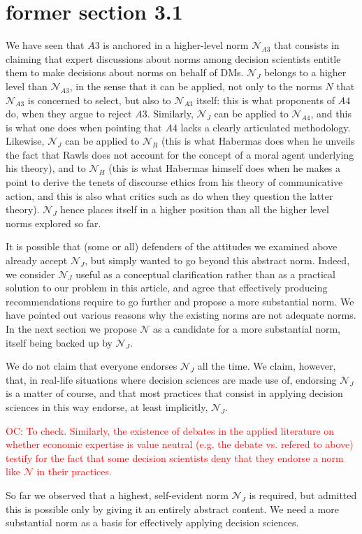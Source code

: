 \documentclass[preprint, french, english, 11pt, authoryear]{elsarticle}%
\newcommand{\commentOC}[1]{\textcolor{red}{OC: #1}}
\newcommand{\adv}{\mathscr{N}}
\newcommand{\fadv}{\mathscr{N}_J}%
\begin{document}
\section{former section 3.1}
We have seen that $A3$ is anchored in a higher-level norm $\mathscr{N}_{A3}$ that consists in claiming that expert discussions about norms among decision scientists entitle them to make decisions about norms on behalf of \acp{DM}. $\fadv$ belongs to a higher level than $\mathscr{N}_{A3}$, in the sense that it can be applied, not only to the norms $N$ that $\mathscr{N}_{A3}$ is concerned to select, but also to $\mathscr{N}_{A3}$ itself: this is what proponents of $A4$ do, when they argue to reject $A3$. Similarly, $\fadv$ can be applied to $\mathscr{N}_{A4}$, and this is what one does when pointing that $A4$ lacks a clearly articulated methodology. Likewise, $\fadv$ can be applied to $\mathscr{N}_{R}$ (this is what Habermas does when he unveils the fact that Rawls does not account for the concept of a moral agent underlying his theory), and to $\mathscr{N}_{H}$ (this is what Habermas himself does when he makes a point to derive the tenets of discourse ethics from his theory of communicative action, and this is also what critics such as \citet{honneth_kritik_1985} do when they question the latter theory). $\fadv$ hence places itself in a higher position than all the higher level norms explored so far.

It is possible that (some or all) defenders of the attitudes we examined above already accept $\fadv$, but simply wanted to go beyond this abstract norm. Indeed, we consider $\fadv$ useful as a conceptual clarification rather than as a practical solution to our problem in this article, and agree that effectively producing recommendations require to go further and propose a more substantial norm. We have pointed out various reasons why the existing norms are not adequate norms. In the next section we propose $\adv$ as a candidate for a more substantial norm, itself being backed up by $\fadv$. 

We do not claim that everyone endorses $\fadv$ all the time. We claim, however, that, in real-life situations where decision sciences are made use of, endorsing $\fadv$ is a matter of course, and that most practices that consist in applying decision sciences in this way endorse, at least implicitly, $\fadv$.


\commentOC{To check. Similarly, the existence of debates in the applied literature on whether economic expertise is value neutral (e.g. the debate \citet{spash_bulldozing_2015} vs. \citet{scharks_dont_2016} refered to above) testify for the fact that some decision scientists deny that they endorse a norm like $\adv$ in their practices.}

So far we observed that a highest, self-evident norm $\fadv$ is required, but admitted this is possible only by giving it an entirely abstract content. We need a more substantial norm as a basis for effectively applying decision sciences.
\end{document}

